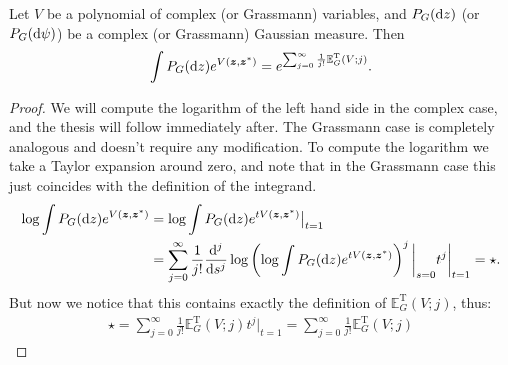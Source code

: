 \begin{proposition}
	Let $V$ be a polynomial of complex (or Grassmann) variables, and $P_G(\mathrm{d} z)$ (or $P_G(\mathrm{d}\psi)$)
	be a complex (or Grassmann) Gaussian measure. Then
	\begin{align*}
		\int P_G(\mathrm{d} z) e^{V(\boldsymbol{z},\boldsymbol{z}^*)}
		= e^{\sum_{j=0}^\infty\frac{1}{j!}\mathbb{E}_G^{\mathrm{T}}(V;j)}.
	\end{align*}
\end{proposition}
\begin{proof}
	We will compute the logarithm of the left hand side in the complex case, and the thesis
	will follow immediately after. The Grassmann case is completely analogous and doesn't
	require any modification. To compute the logarithm we take a Taylor expansion around zero,
	and note that in the Grassmann case this just coincides with the definition of the integrand.
	\begin{align*}
		\log\int P_G(\mathrm{d} z) e^{V(\boldsymbol{z},\boldsymbol{z}^*)}
		&= \log\int P_G(\mathrm{d} z)e^{tV(\boldsymbol{z},\boldsymbol{z}^*)}\big|_{t=1}\\
		&= \sum_{j=0}^\infty \frac{1}{j!}\frac{\mathrm{d}^j}{\mathrm{d} s^j} \log\left(
		\log\int P_G(\mathrm{d} z)e^{tV(\boldsymbol{z},\boldsymbol{z}^*)}
		\right)^j \bigg|_{s=0} t^j \bigg|_{t=1} = \star.
	\end{align*}
	But now we notice that this contains exactly the definition of $\mathbb{E}_G^{\mathrm{T}}(V;j)$,
	thus:
	\begin{align*}
		\star = \sum_{j=0}^\infty \frac{1}{j!}\mathbb{E}_G^{\mathrm{T}}(V;j)t^j \big|_{t=1}
		= \sum_{j=0}^\infty \frac{1}{j!}\mathbb{E}_G^{\mathrm{T}}(V;j)
	\end{align*}
\end{proof}


